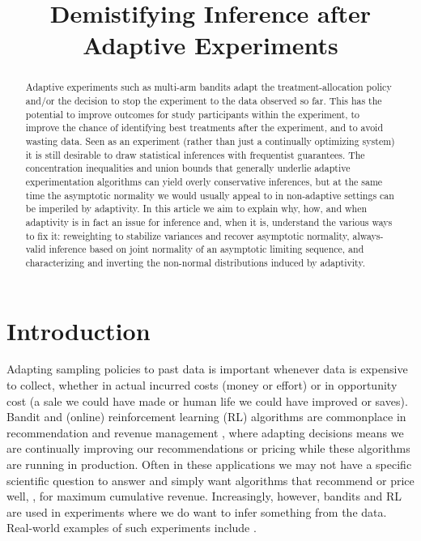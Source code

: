
\title{Demistifying Inference after Adaptive Experiments}
\maketitle

\begin{abstract}
Adaptive experiments such as multi-arm bandits adapt the treatment-allocation policy and/or the decision to stop the experiment to the data observed so far. This has the potential to improve outcomes for study participants within the experiment, to improve the chance of identifying best treatments after the experiment, and to avoid wasting data. Seen as an experiment (rather than just a continually optimizing system) it is still desirable to draw statistical inferences with frequentist guarantees. The concentration inequalities and union bounds that generally underlie adaptive experimentation algorithms can yield overly conservative inferences, but at the same time the asymptotic normality we would usually appeal to in non-adaptive settings can be imperiled by adaptivity. In this article we aim to explain why, how, and when adaptivity is in fact an issue for inference and, when it is, understand the various ways to fix it: reweighting to stabilize variances and recover asymptotic normality, always-valid inference based on joint normality of an asymptotic limiting sequence, and characterizing and inverting the non-normal distributions induced by adaptivity.
\end{abstract}



\section{Introduction}

Adapting sampling policies to past data is important whenever data is expensive to collect, whether in actual incurred costs (money or effort) or in opportunity cost (a sale we could have made or human life we could have improved or saves). Bandit and (online) reinforcement learning (RL) algorithms are commonplace in recommendation \citep[\eg,][]{li2010contextual} and revenue management \citep[\eg,][]{qiang2016dynamic,kallus2020dynamic}, where adapting decisions means we are continually improving our recommendations or pricing while these algorithms are running in production. Often in these applications we may not have a specific scientific question to answer and simply want algorithms that recommend or price well, \eg, for maximum cumulative revenue. Increasingly, however, bandits and RL are used in experiments where we do want to infer something from the data. Real-world examples of such experiments include \citet{cohen2015price,athey2022contextual,caria2023adaptive,offer2020optimal}.

